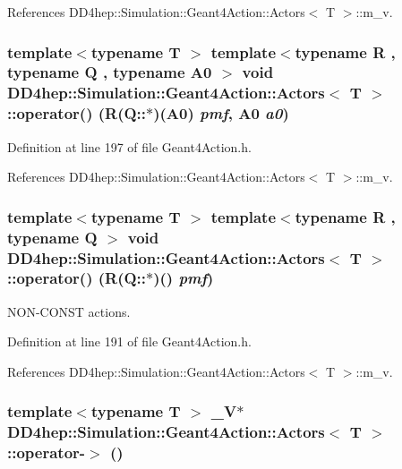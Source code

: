References DD4hep::Simulation::Geant4Action::Actors$<$ T $>$::m\_\-v.\hypertarget{class_d_d4hep_1_1_simulation_1_1_geant4_action_1_1_actors_a61fa5e9370c05c3c2426d9ec54c0026b}{
\subsubsection[{operator()}]{\setlength{\rightskip}{0pt plus 5cm}template$<$typename T $>$ template$<$typename R , typename Q , typename A0 $>$ void {\bf DD4hep::Simulation::Geant4Action::Actors}$<$ {\bf T} $>$::operator() (R(Q::$\ast$)(A0) {\em pmf}, \/  A0 {\em a0})}}
\label{class_d_d4hep_1_1_simulation_1_1_geant4_action_1_1_actors_a61fa5e9370c05c3c2426d9ec54c0026b}


Definition at line 197 of file Geant4Action.h.

References DD4hep::Simulation::Geant4Action::Actors$<$ T $>$::m\_\-v.\hypertarget{class_d_d4hep_1_1_simulation_1_1_geant4_action_1_1_actors_a7f3d71a8b04e5f6068496a7ebbc25837}{
\subsubsection[{operator()}]{\setlength{\rightskip}{0pt plus 5cm}template$<$typename T $>$ template$<$typename R , typename Q $>$ void {\bf DD4hep::Simulation::Geant4Action::Actors}$<$ {\bf T} $>$::operator() (R(Q::$\ast$)() {\em pmf})}}
\label{class_d_d4hep_1_1_simulation_1_1_geant4_action_1_1_actors_a7f3d71a8b04e5f6068496a7ebbc25837}


NON-\/CONST actions. 

Definition at line 191 of file Geant4Action.h.

References DD4hep::Simulation::Geant4Action::Actors$<$ T $>$::m\_\-v.\hypertarget{class_d_d4hep_1_1_simulation_1_1_geant4_action_1_1_actors_a74da9b8e362394518116e48f8f0d6c63}{
\subsubsection[{operator-\/$>$}]{\setlength{\rightskip}{0pt plus 5cm}template$<$typename T $>$ {\bf \_\-V}$\ast$ {\bf DD4hep::Simulation::Geant4Action::Actors}$<$ {\bf T} $>$::operator-\/$>$ ()}}
\label{class_d_d4hep_1_1_simulation_1_1_geant4_action_1_1_actors_a74da9b8e362394518116e48f8f0d6c63}



